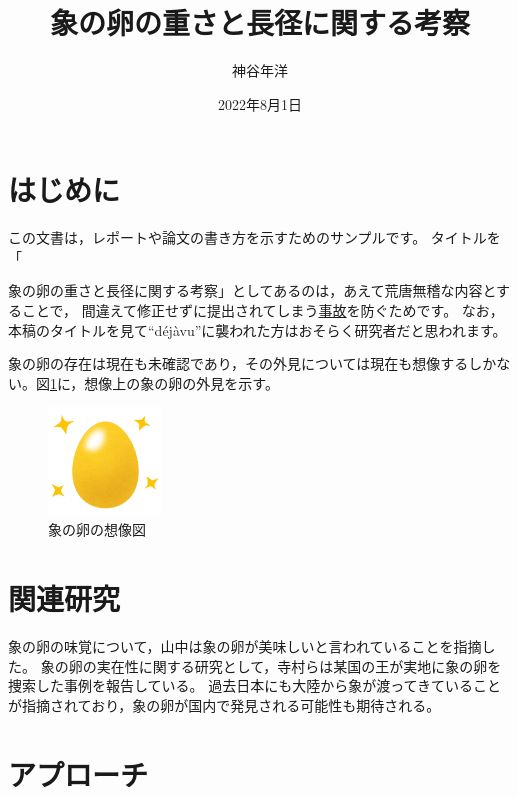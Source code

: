 \documentclass[dvipdfmx]{jsarticle}
\begin{document}
\title{象の卵の重さと長径に関する考察}
\author{神谷年洋}
\date{2022年8月1日}
\maketitle

\section{はじめに}

この文書は，レポートや論文の書き方を示すためのサンプルです。
タイトルを「{象の卵の重さと長径に関する考察」としてあるのは，あえて荒唐無稽な内容とすることで，
間違えて修正せずに提出されてしまう\href{https://twitter.com/taku_ymnk/status/392959147974471681?s=20&t=3p7I92WEGvoPpj_7d-dtyA}{事故}を防ぐためです。 %
なお，本稿のタイトルを見て``d\'{e}j\`{a}vu''に襲われた方はおそらく研究者だと思われます。 %

象の卵の存在は現在も未確認であり，その外見については現在も想像するしかない。図\ref{fig:golden_egg}に，想像上の象の卵の外見を示す。 %

\begin{figure}[htp]
\centering
\includegraphics[width=3cm]{golden_egg.png}
\caption{象の卵の想像図}
\label{fig:golden_egg}
\end{figure}

\section{関連研究}
\label{sec:related} %

象の卵の味覚について，山中\cite{kakenhi_latex}は象の卵が美味しいと言われていることを指摘した。 %
象の卵の実在性に関する研究として，寺村ら\cite{teramura2009}は某国の王が実地に象の卵を捜索した事例を報告している。
過去日本にも大陸から象が渡ってきていることが指摘\cite{kamei1990}されており，象の卵が国内で発見される可能性も期待される。

\section{アプローチ}

}
\end{document}
